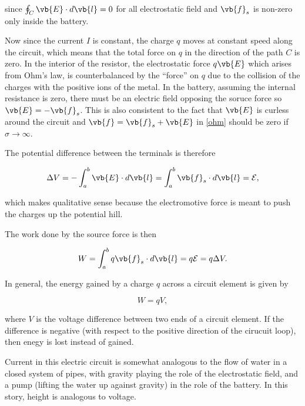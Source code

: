 \documentclass[english,a4paper,12pt]{report}
\begin{document}
since \(\oint_{C} \vb{E} \cdot d \vb{l} =0 \) for all electrostatic field and \(\vb{f} _{s} \) is non-zero only inside the battery. 

Now since the current \(I\) is constant, the charge \(q\) moves at constant speed along the circuit, which means that the total force on \(q\) in the direction of the path \(C\) is zero. In the interior of the resistor, the electrostatic force \( q\vb{E}  \) which arises from Ohm's law, is counterbalanced by the ``force'' on \(q\) due to the collision of the charges with the positive ions of the metal. In the battery, assuming the internal resistance is zero, there must be an electric field opposing the soruce force so \(\vb{E} = - \vb{f} _{s} \). This is also consistent to the fact that \(\vb{E} \) is curless around the circuit and \(\vb{f} = \vb{f} _{s} + \vb{E}  \) in \cref{ohm} should be zero if \(\sigma \rightarrow \infty\). 

The potential difference between the terminals is therefore 

\begin{equation}
    \Delta V = -\int_{a}^{b} \vb{E} \cdot d \vb{l} = \int_{a}^{b} \vb{f} _{s} \cdot d \vb{l} = \mathcal{E},
\end{equation}

which makes qualitative sense because the electromotive force is meant to push the charges up the potential hill.

The work done by the source force is then 

\begin{equation}
    W = \int_{a}^{b} q \vb{f} _{s} \cdot d \vb{l} = q \mathcal{E} = q\Delta V.
\end{equation}

In general, the energy gained by a charge \(q\) across a circuit element is given by 

\begin{equation}
    W = qV,
\end{equation}

where \(V\) is the voltage difference between two ends of a circuit element. If the difference is negative (with respect to the positive direction of the cirucuit loop), then enegy is lost instead of gained.

Current in this electric circuit is somewhat analogous to the flow of water in a closed system of pipes, with gravity playing the role of the electrostatic field, and a pump (lifting the water up against gravity) in the role of the battery. In this story, height is analogous to voltage.
\end{document}
